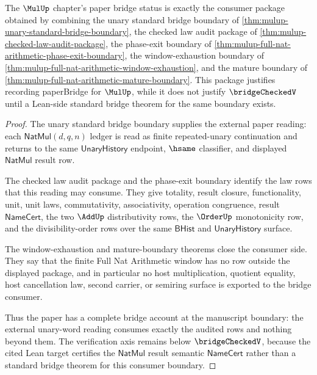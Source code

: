 \begin{theorem}
\label{thm:mulup-bridge-consumer-status-alignment}
The $\MulUp$ chapter's paper bridge status is exactly the consumer package
obtained by combining the unary standard bridge boundary of
\autoref{thm:mulup-unary-standard-bridge-boundary}, the checked law audit
package of \autoref{thm:mulup-checked-law-audit-package}, the phase-exit
boundary of \autoref{thm:mulup-full-nat-arithmetic-phase-exit-boundary}, the
window-exhaustion boundary of
\autoref{thm:mulup-full-nat-arithmetic-window-exhaustion}, and the mature
boundary of \autoref{thm:mulup-full-nat-arithmetic-mature-boundary}. This
package justifies recording paperBridge for $\MulUp$, while it does not justify
$\bridgeCheckedV$ until a Lean-side standard bridge theorem for the same
boundary exists.
\end{theorem}
\begin{proof}
The unary standard bridge boundary supplies the external paper reading: each
$\mathsf{NatMul}(d,q,n)$ ledger is read as finite repeated-unary continuation
and returns to the same $\mathsf{UnaryHistory}$ endpoint, $\hsame$ classifier,
and displayed $\mathsf{NatMul}$ result row.

The checked law audit package and the phase-exit boundary identify the law rows
that this reading may consume. They give totality, result closure,
functionality, unit, unit laws, commutativity, associativity, operation
congruence, result $\mathsf{NameCert}$, the two $\AddUp$ distributivity rows,
the $\OrderUp$ monotonicity row, and the divisibility-order rows over the same
$\mathsf{BHist}$ and $\mathsf{UnaryHistory}$ surface.

The window-exhaustion and mature-boundary theorems close the consumer side.
They say that the finite Full Nat Arithmetic window has no row outside the
displayed package, and in particular no host multiplication, quotient equality,
host cancellation law, second carrier, or semiring surface is exported to the
bridge consumer.

Thus the paper has a complete bridge account at the manuscript boundary: the
external unary-word reading consumes exactly the audited rows and nothing beyond
them. The verification axis remains below $\bridgeCheckedV$, because the cited
Lean target certifies the $\mathsf{NatMul}$ result semantic
$\mathsf{NameCert}$ rather than a standard bridge theorem for this consumer
boundary.
\end{proof}

